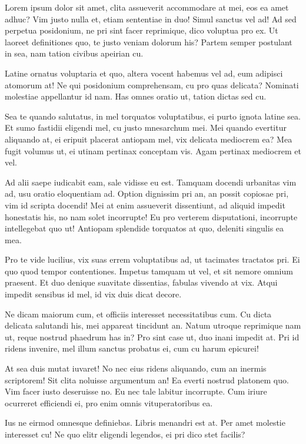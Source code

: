 \documentclass[
	12pt,				%
	openright,			%
	oneside,			%
	a4paper,			%
	english,			%
	french,				%
	spanish,			%
	brazil,				%
	]{abntex2}
\begin{document}
Lorem ipsum dolor sit amet, clita assueverit accommodare at mei, eos ea amet adhuc? Vim justo nulla et, etiam sententiae in duo! Simul sanctus vel ad! Ad sed perpetua posidonium, ne pri sint facer reprimique, dico voluptua pro ex. Ut laoreet definitiones quo, te justo veniam dolorum his? Partem semper postulant in sea, nam tation civibus apeirian cu.

Latine ornatus voluptaria et quo, altera vocent habemus vel ad, eum adipisci atomorum at! Ne qui posidonium comprehensam, cu pro quas delicata? Nominati molestiae appellantur id nam. Has omnes oratio ut, tation dictas sed cu.

Sea te quando salutatus, in mel torquatos voluptatibus, ei purto ignota latine sea. Et sumo fastidii eligendi mel, cu justo mnesarchum mei. Mei quando evertitur aliquando at, ei eripuit placerat antiopam mel, vix delicata mediocrem ea? Mea fugit volumus ut, ei utinam pertinax conceptam vis. Agam pertinax mediocrem et vel.

Ad alii saepe iudicabit eam, sale vidisse eu est. Tamquam docendi urbanitas vim ad, usu oratio eloquentiam ad. Option dignissim pri an, an possit copiosae pri, vim id scripta docendi! Mei at enim assueverit dissentiunt, ad aliquid impedit honestatis his, no nam solet incorrupte! Eu pro verterem disputationi, incorrupte intellegebat quo ut! Antiopam splendide torquatos at quo, deleniti singulis ea mea.

Pro te vide lucilius, vix suas errem voluptatibus ad, ut tacimates tractatos pri. Ei quo quod tempor contentiones. Impetus tamquam ut vel, et sit nemore omnium praesent. Et duo denique suavitate dissentias, fabulas vivendo at vix. Atqui impedit sensibus id mel, id vix duis dicat decore.

Ne dicam maiorum cum, et officiis interesset necessitatibus cum. Cu dicta delicata salutandi his, mei appareat tincidunt an. Natum utroque reprimique nam ut, reque nostrud phaedrum has in? Pro sint case ut, duo inani impedit at. Pri id ridens invenire, mel illum sanctus probatus ei, cum cu harum epicurei!

At sea duis mutat iuvaret! No nec eius ridens aliquando, cum an inermis scriptorem! Sit clita noluisse argumentum an! Ea everti nostrud platonem quo. Vim facer iusto deseruisse no. Eu nec tale labitur incorrupte. Cum iriure ocurreret efficiendi ei, pro enim omnis vituperatoribus ea.

Ius ne eirmod omnesque definiebas. Libris menandri est at. Per amet molestie interesset cu! Ne quo elitr eligendi legendos, ei pri dico stet facilis?
\end{document}
